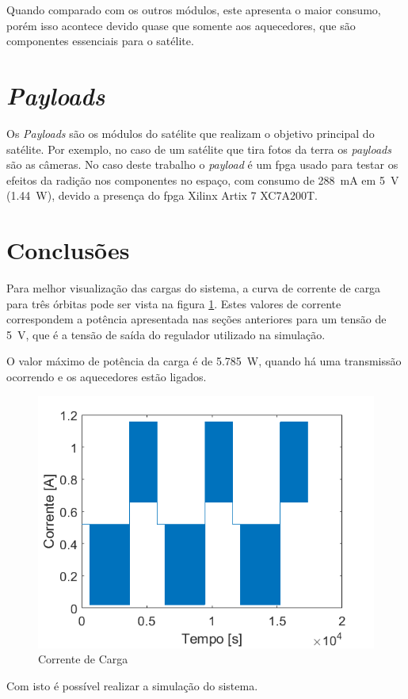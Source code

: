 Quando comparado com os outros módulos, este apresenta o maior consumo, porém isso acontece devido quase que somente aos aquecedores, que são componentes essenciais para o satélite.

\section{\textit{Payloads}}

Os \textit{Payloads} são os módulos do satélite que realizam o objetivo principal do satélite. Por exemplo, no caso de um satélite que tira fotos da terra os \textit{payloads} são as câmeras. No caso deste trabalho o \textit{payload} é um \gls{fpga} usado para testar os efeitos da radição nos componentes no espaço, com consumo de \SI{288}{\milli\ampere} em \SI{5}{\volt} (\SI{1,44}{\watt}), devido a presença do \gls{fpga} Xilinx Artix 7 XC7A200T.

\section{Conclusões}

Para melhor visualização das cargas do sistema, a curva de corrente de carga para três órbitas pode ser vista na figura \ref{figura_corrente_carga}. Estes valores de corrente correspondem a potência apresentada nas seções anteriores para um tensão de \SI{5}{\volt}, que é a tensão de saída do regulador utilizado na simulação.

O valor máximo de potência da carga é de \SI{5.785}{\watt}, quando há uma transmissão ocorrendo e os aquecedores estão ligados.

\begin{figure}[!htpb]
\begin{center}
\includegraphics[scale=0.5]{figures/loadCurrent.png}
\end{center}
\caption{Corrente de Carga}
\label{figura_corrente_carga}
\end{figure}

Com isto é possível realizar a simulação do sistema.